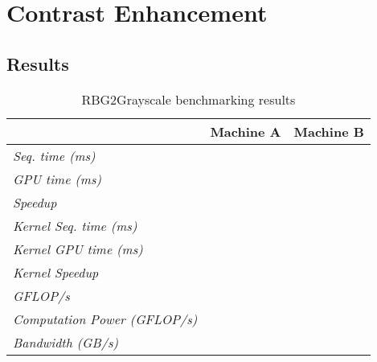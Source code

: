 \documentclass[final]{report}
\begin{document}
\chapter{Contrast Enhancement}

\section{Results}
\begin{table}[H]
	\centering
	\caption{RBG2Grayscale benchmarking results}
	\label{tab:rgb2grayscale-results}
	\begin{tabular}{lll}
	\toprule
											& \textbf{Machine A} 	& \textbf{Machine B} \\
	\midrule
	\textit{Seq. time (ms)} 				& ~ 					& ~ \\
	\textit{GPU time (ms)} 					& ~ 					& ~ \\
	\textit{Speedup} 						& ~ 					& ~ \\
	\midrule
	\textit{Kernel Seq. time (ms)} 			& ~ 					& ~ \\
	\textit{Kernel GPU time (ms)} 			& ~ 					& ~ \\
	\textit{Kernel Speedup} 				& ~ 					& ~ \\
	\midrule
	\textit{GFLOP/s} 						& ~ 					& ~ \\
	\textit{Computation Power (GFLOP/s)} 	& ~ 					& ~ \\
	\textit{Bandwidth (GB/s)}				& ~ 					& ~ \\
	\bottomrule
	\end{tabular}
\end{table}

\end{document}
